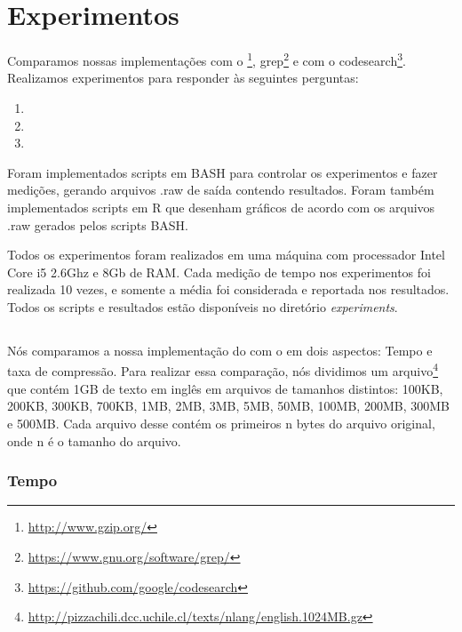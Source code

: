\section{Experimentos}
Comparamos nossas implementações com o
\gzip\footnote{\url{http://www.gzip.org/}},
grep\footnote{\url{https://www.gnu.org/software/grep/}} e com o
codesearch\footnote{\url{https://github.com/google/codesearch}}.
Realizamos experimentos para responder às seguintes perguntas:
\begin{enumerate}
\item \rqone
\item \rqtwo
\item \rqthree
\end{enumerate}

Foram implementados scripts em BASH para controlar os experimentos e fazer
medições, gerando arquivos .raw de saída contendo resultados. Foram também
implementados scripts em R que desenham gráficos de acordo com os arquivos .raw
gerados pelos scripts BASH.


Todos os experimentos foram realizados em uma máquina com processador Intel Core
i5 2.6Ghz e 8Gb de RAM. Cada medição de tempo nos experimentos foi realizada 10
vezes, e somente a média foi considerada e reportada nos resultados.
Todos os scripts e resultados estão disponíveis no diretório {\it experiments}.

\subsection{\rqone}
Nós comparamos a nossa implementação do \lz com o \gzip em dois aspectos: Tempo
e taxa de compressão.
Para realizar essa comparação, nós dividimos um arquivo\footnote{
\url{http://pizzachili.dcc.uchile.cl/texts/nlang/english.1024MB.gz}}
que contém 1GB de texto em inglês em arquivos de
tamanhos distintos: 100KB, 200KB, 300KB, 700KB, 1MB, 2MB, 3MB, 5MB, 50MB, 100MB,
200MB, 300MB e 500MB. Cada arquivo desse contém os primeiros n bytes do
arquivo original, onde n é o tamanho do arquivo.

\subsubsection{Tempo}

